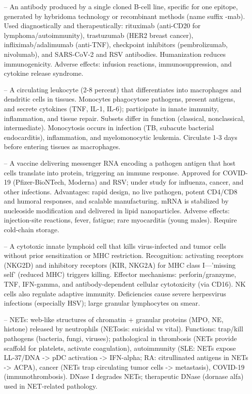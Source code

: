 -- An antibody produced by a single cloned B-cell line, specific for one epitope, generated by hybridoma technology or recombinant methods (name suffix -mab). Used diagnostically and therapeutically: rituximab (anti-CD20 for lymphoma/autoimmunity), trastuzumab (HER2 breast cancer), infliximab/adalimumab (anti-TNF), checkpoint inhibitors (pembrolizumab, nivolumab), and SARS-CoV-2 and RSV antibodies. Humanization reduces immunogenicity. Adverse effects: infusion reactions, immunosuppression, and cytokine release syndrome.

-- A circulating leukocyte (2-8 percent) that differentiates into macrophages and dendritic cells in tissues. Monocytes phagocytose pathogens, present antigens, and secrete cytokines (TNF, IL-1, IL-6); participate in innate immunity, inflammation, and tissue repair. Subsets differ in function (classical, nonclassical, intermediate). Monocytosis occurs in infection (TB, subacute bacterial endocarditis), inflammation, and myelomonocytic leukemia. Circulate 1-3 days before entering tissues as macrophages.

-- A vaccine delivering messenger RNA encoding a pathogen antigen that host cells translate into protein, triggering an immune response. Approved for COVID-19 (Pfizer-BioNTech, Moderna) and RSV; under study for influenza, cancer, and other infections. Advantages: rapid design, no live pathogen, potent CD4/CD8 and humoral responses, and scalable manufacturing. mRNA is stabilized by nucleoside modification and delivered in lipid nanoparticles. Adverse effects: injection-site reactions, fever, fatigue; rare myocarditis (young males). Require cold-chain storage.

-- A cytotoxic innate lymphoid cell that kills virus-infected and tumor cells without prior sensitization or MHC restriction. Recognition: activating receptors (NKG2D) and inhibitory receptors (KIR, NKG2A) for MHC class I—'missing self' (reduced MHC) triggers killing. Effector mechanisms: perforin/granzyme, TNF, IFN-gamma, and antibody-dependent cellular cytotoxicity (via CD16). NK cells also regulate adaptive immunity. Deficiencies cause severe herpesvirus infections (especially HSV); large granular lymphocytes on smear.

-- NETs: web-like structures of chromatin + granular proteins (MPO, NE, histone) released by neutrophils (NETosis: suicidal vs vital). Functions: trap/kill pathogens (bacteria, fungi, viruses); pathological in thrombosis (NETs provide scaffold for platelets, activate coagulation), autoimmunity (SLE: NETs expose LL-37/DNA -> pDC activation -> IFN-alpha; RA: citrullinated antigens in NETs -> ACPA), cancer (NETs trap circulating tumor cells -> metastasis), COVID-19 (immunothrombosis). DNase I degrades NETs; therapeutic DNase (dornase alfa) used in NET-related pathology.

